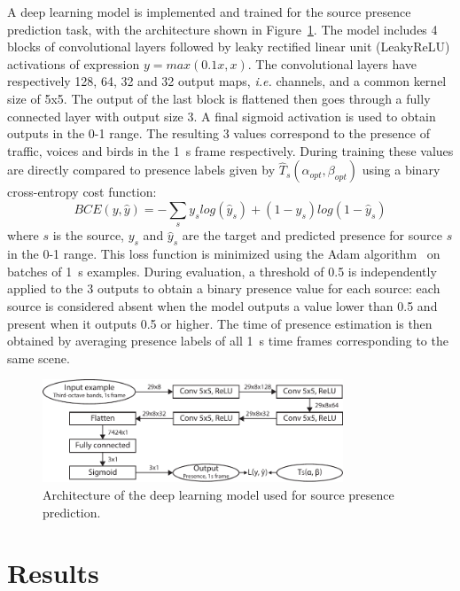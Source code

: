 \documentclass[11pt,a4paper]{article}
\begin{document}
A deep learning model is implemented and trained for the source presence prediction task, with the architecture shown in Figure~\ref{fig:deep_arch}. The model includes 4 blocks of convolutional layers followed by leaky rectified linear unit (LeakyReLU) activations of expression $y = max(0.1x, x)$. The convolutional layers have respectively 128, 64, 32 and 32 output maps, \textit{i.e.} channels, and a common kernel size of 5x5. The output of the last block is flattened then goes through a fully connected layer with output size 3. A final sigmoid activation is used to obtain outputs in the 0-1 range. The resulting 3 values correspond to the presence of traffic, voices and birds in the 1~s frame respectively. During training these values are directly compared to presence labels given by $\hat T_s(\alpha_{opt}, \beta_{opt})$ using a binary cross-entropy cost function:
\begin{equation}
BCE(y, \hat y) = -\sum_s y_s log\left(\hat y_s\right) + (1-y_s) log\left(1-\hat y_s\right)
\end{equation}
where $s$ is the source, $y_s$ and $\hat y_s$ are the target and predicted presence for source $s$ in the 0-1 range. This loss function is minimized using the Adam algorithm~\cite{kingma2015} on batches of 1~s examples. During evaluation, a threshold of 0.5 is independently applied to the 3 outputs to obtain a binary presence value for each source: each source is considered absent when the model outputs a value lower than 0.5 and present when it outputs 0.5 or higher. The time of presence estimation is then obtained by averaging presence labels of all 1~s time frames corresponding to the same scene.

\begin{figure}[!h]
    \centering
    \includegraphics[width=0.8\textwidth]{figures/deep_arch.pdf}
    \caption{Architecture of the deep learning model used for source presence prediction.}\label{fig:deep_arch}
\end{figure}

\section{Results}
\label{sec:results}
\end{document}
